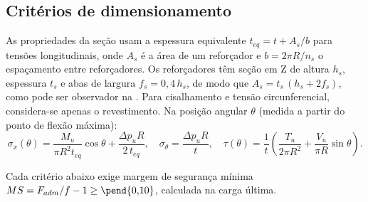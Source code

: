 \subsection{Critérios de dimensionamento}
 
As propriedades da seção usam a espessura equivalente $t_{eq} = t + A_s/b$ para tensões longitudinais, onde $A_s$ é a área de um reforçador e $b = 2\pi R/n_s$ o espaçamento entre reforçadores. Os reforçadores têm seção em Z de altura $h_s$, espessura $t_s$ e abas de largura $f_s = 0{,}4\,h_s$, de modo que $A_s = t_s\,(h_s + 2 f_s)$, como pode ser observador na . Para cisalhamento e tensão circunferencial, considera-se apenas o revestimento. Na posição angular $\theta$ (medida a partir do ponto de flexão máxima):
\begin{equation}
  \sigma_x(\theta) = \frac{M_u}{\pi R^2 t_{eq}}\cos\theta + \frac{\Delta p_u R}{2\, t_{eq}}, \quad
  \sigma_\theta = \frac{\Delta p_u R}{t}, \quad
  \tau(\theta) = \frac{1}{t}\left(\frac{T_u}{2\pi R^2} + \frac{V_u}{\pi R}\sin\theta\right).
\end{equation}
 
Cada critério abaixo exige margem de segurança mínima $MS = F_{adm}/f - 1 \geq \pend{0{,}10}$, calculada na carga última.
 
